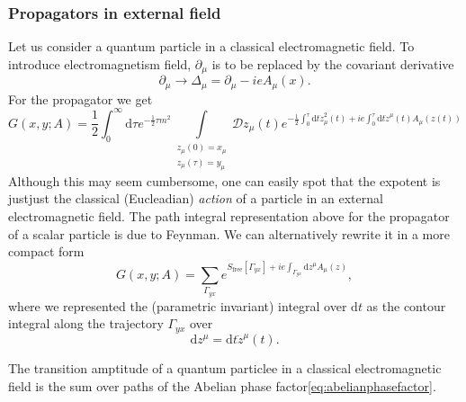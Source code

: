 \subsubsection{Propagators in external field}
Let us consider a quantum particle in a classical electromagnetic field. To
introduce electromagnetism field, $\partial_\mu$ is to be replaced by the
covariant derivative
\begin{equation}
  \partial_\mu \rightarrow \Delta_\mu = \partial_\mu - ieA_\mu(x).
\end{equation}
For the propagator we get
\begin{equation}
  G(x,y;A) = \frac{1}{2}\int_0^\infty\mathrm{d}\tau e^{-\frac{1}{2}\tau
      m^2}\int\limits_{\substack{z_\mu(0)=x_\mu\\ z_\mu(\tau)=y_\mu
        }}{\mathcal{D}z_\mu(t)e^{-\frac{1}{2}\int_0^\tau
        \mathrm{d}t\dot{z}^2_\mu(t)
    + ie\int_0^\tau\mathrm{d}t\dot{z}^\mu(t)A_\mu(z(t))}}
\end{equation}
Although this may seem cumbersome, one can easily spot that the expotent is
justjust the classical (Eucleadian) \textit{action} of a particle in an
external electromagnetic field. The path integral representation above for the
propagator of a scalar particle is due to Feynman. We can alternatively rewrite
it in a more compact form
\begin{equation}
  G(x,y;A)
  = \sum_{\Gamma_{yx}}{e^{S_{\mathrm{free}}[\Gamma_{yx}]+ie\int_{\Gamma_{yx}}\mathrm{d}z^\mu
  A_\mu(z)}},
\end{equation}
where we represented the (parametric invariant) integral over $\mathrm{d}t$ as
the contour integral along the trajectory $\Gamma_{yx}$ over
\begin{equation}
  \mathrm{d}z^\mu = \mathrm{d}t \dot{z}^\mu(t).
\end{equation}

The transition amptitude of a quantum particlee in a classical electromagnetic
field is the sum over paths of the Abelian phase
factor\eqref{eq:abelianphasefactor}.

